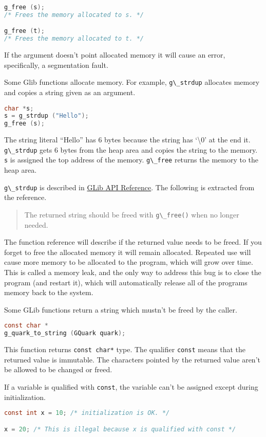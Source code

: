 \begin{lstlisting}[language=C]
g_free (s);
/* Frees the memory allocated to s. */

g_free (t);
/* Frees the memory allocated to t. */
\end{lstlisting}

If the argument doesn't point allocated memory it will cause an error,
specifically, a segmentation fault.

Some Glib functions allocate memory. For example,
\passthrough{\lstinline!g\_strdup!} allocates memory and copies a string
given as an argument.

\begin{lstlisting}[language=C]
char *s;
s = g_strdup ("Hello");
g_free (s);
\end{lstlisting}

The string literal ``Hello'' has 6 bytes because the string has
`\textbackslash0' at the end it. \passthrough{\lstinline!g\_strdup!}
gets 6 bytes from the heap area and copies the string to the memory.
\passthrough{\lstinline!s!} is assigned the top address of the memory.
\passthrough{\lstinline!g\_free!} returns the memory to the heap area.

\passthrough{\lstinline!g\_strdup!} is described in
\href{https://docs.gtk.org/glib/func.strdup.html}{GLib API Reference}.
The following is extracted from the reference.

\begin{quote}
The returned string should be freed with
\passthrough{\lstinline!g\_free()!} when no longer needed.
\end{quote}

The function reference will describe if the returned value needs to be
freed. If you forget to free the allocated memory it will remain
allocated. Repeated use will cause more memory to be allocated to the
program, which will grow over time. This is called a memory leak, and
the only way to address this bug is to close the program (and restart
it), which will automatically release all of the programs memory back to
the system.

Some GLib functions return a string which mustn't be freed by the
caller.

\begin{lstlisting}[language=C]
const char *
g_quark_to_string (GQuark quark);
\end{lstlisting}

This function returns \passthrough{\lstinline!const char*!} type. The
qualifier \passthrough{\lstinline!const!} means that the returned value
is immutable. The characters pointed by the returned value aren't be
allowed to be changed or freed.

If a variable is qualified with \passthrough{\lstinline!const!}, the
variable can't be assigned except during initialization.

\begin{lstlisting}[language=C]
const int x = 10; /* initialization is OK. */

x = 20; /* This is illegal because x is qualified with const */
\end{lstlisting}
